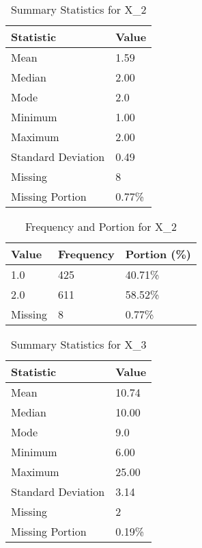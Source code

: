 \begin{table}[H]
\centering
\begin{tabular}{|l|l|}
\hline
\textbf{Statistic} & \textbf{Value} \\ \hline
Mean               & 1.59 \\ \hline
Median             & 2.00 \\ \hline
Mode               & 2.0 \\ \hline
Minimum            & 1.00 \\ \hline
Maximum            & 2.00 \\ \hline
Standard Deviation & 0.49 \\ \hline
Missing            & 8 \\ \hline
Missing Portion    & 0.77\% \\ \hline
\end{tabular}
\caption{Summary Statistics for X_2}
\end{table}

\begin{table}[H]
\centering
\begin{tabular}{|l|l|l|}
\hline
\textbf{Value} & \textbf{Frequency} & \textbf{Portion (\%)} \\ \hline
1.0 & 425 & 40.71\% \\ \hline
2.0 & 611 & 58.52\% \\ \hline
Missing & 8 & 0.77\% \\ \hline
\end{tabular}
\caption{Frequency and Portion for X_2}
\end{table}

\begin{table}[H]
\centering
\begin{tabular}{|l|l|}
\hline
\textbf{Statistic} & \textbf{Value} \\ \hline
Mean               & 10.74 \\ \hline
Median             & 10.00 \\ \hline
Mode               & 9.0 \\ \hline
Minimum            & 6.00 \\ \hline
Maximum            & 25.00 \\ \hline
Standard Deviation & 3.14 \\ \hline
Missing            & 2 \\ \hline
Missing Portion    & 0.19\% \\ \hline
\end{tabular}
\caption{Summary Statistics for X_3}
\end{table}


